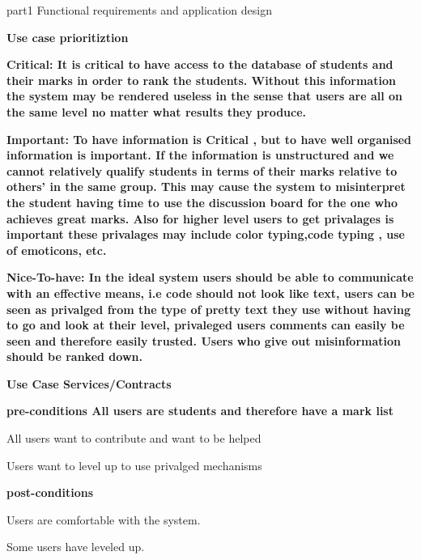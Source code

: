 \documentclass[12pt, oneside]{book}
\begin{document}
\Huge
part1\linebreak
Functional requirements and application design\linebreak\linebreak\linebreak

\Huge \bf Use case prioritiztion

\large \bf Critical: \small\sf It is critical to have access to the database of students and their marks in order to rank the students. Without this information the system may be rendered useless in the sense that users are all on the same level no matter what results they produce.\par

\large \bf Important: \small\sf To have information is Critical , but to have well organised information is important. If the information is unstructured and we cannot relatively qualify students in terms of their marks relative to others' in the same group. This may cause the system to misinterpret the student having time to use the discussion board for the one who achieves great marks. Also for higher level users to get privalages is important these privalages may include color typing,code typing , use of emoticons, etc.\par

\large \bf Nice-To-have: \small\sf In the ideal system users should be able to communicate with an effective means, i.e code should not look like text, users can be seen as privalged from the type of pretty text they use without having to go and look at their level, privaleged users comments can easily be seen and therefore easily trusted. Users who give out misinformation should be ranked down.\par
\clearpage

\Huge \bf Use Case Services/Contracts 

\large \bf pre-conditions \linebreak
\small \sf All users are students and therefore have a mark list \par
\small All users want to contribute and want to be helped \par
\small Users want to level up to use privalged mechanisms \par

\large \bf post-conditions \par
\small \sf Users are comfortable with the system.\par
\small Some users have leveled up.\par
\end{document}
